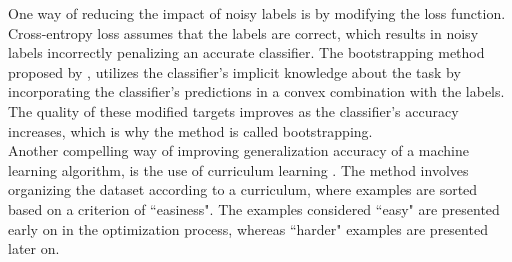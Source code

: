 One way of reducing the impact of noisy labels is by modifying the loss function. Cross-entropy loss assumes that the labels are correct, which results in noisy labels incorrectly penalizing an accurate classifier. The bootstrapping method proposed by \citep{Reed_noisy_labels_bootstrapping}, utilizes the classifier's implicit knowledge about the task by incorporating the classifier's predictions in a convex combination with the labels. The quality of these modified targets improves as the classifier's accuracy increases, which is why the method is called bootstrapping.\\

Another compelling way of improving generalization accuracy of a machine learning algorithm, is the use of curriculum learning \citep{Bengio_curriculumlearning}. The method involves organizing the dataset according to a curriculum, where examples are sorted based on a criterion of ``easiness". The examples considered ``easy" are presented early on in the optimization process, whereas ``harder" examples are presented later on.
